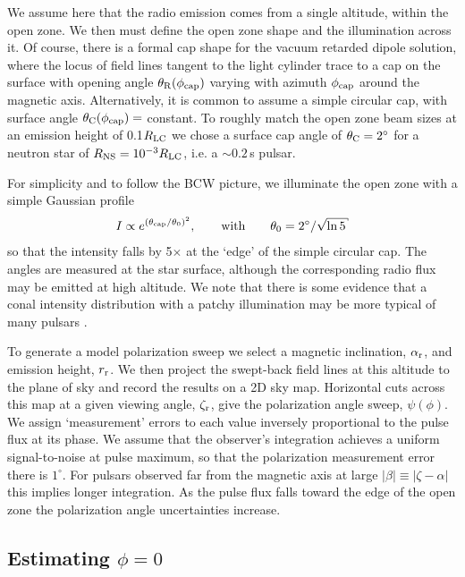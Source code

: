 	We assume here that the radio emission comes from a single altitude, 
within the open zone. We then must define the open zone shape and the illumination
across it. Of course, there is a formal cap shape for the vacuum retarded 
dipole solution, where the locus of field lines tangent to
the light cylinder trace to a cap on the surface with opening angle
$\theta_{\rm{R}} (\phi_{\rm{cap}})$ varying with azimuth $\phi_{\rm{cap}}$ around the magnetic axis.
Alternatively, it is common to assume a simple circular cap, with
surface angle $\theta_{\rm{C}} (\phi_{\rm{cap}})=$ constant. To roughly match the open zone
beam sizes at an emission height of 0.1$R_{\rm{LC}}$ we chose a surface cap angle of $\theta_{\rm{C}}=2^\circ$
for a neutron star of $R_{\rm{NS}} = 10^{-3}R_{\rm{LC}}$, i.e. a $\sim 0.2$\,s pulsar.

	For simplicity and to follow the BCW picture, we illuminate the open 
zone with a simple Gaussian profile 
\begin{equation}\label{eq:Ipulse}
I \propto e^{(\theta_{\rm{cap}}/\theta_0)^2},\qquad {\rm with }\qquad \theta_0=2^\circ/{\sqrt{\ln 5}}
\end{equation}
so that the intensity falls by 5$\times$ at the `edge' of the simple circular cap.
The angles are measured at the star surface, although the corresponding radio flux
may be emitted at high altitude.
We note that there is some evidence that a conal intensity distribution
with a patchy illumination may be more typical of many pulsars \citep{lyne1988shape,karastergiou2007empirical}. 

	To generate a model polarization sweep we select a magnetic inclination, $\alpha_{\rm{r}}$,
and emission height, $r_{\rm{r}}$. We then project the swept-back field lines 
at this altitude to the plane of sky and record the results on a 2D sky map.
Horizontal cuts across this map at a given viewing angle, $\zeta_{\rm{r}}$, give the
polarization angle sweep, $\psi(\phi)$. We assign `measurement' errors to each value inversely proportional
to the pulse flux at its phase. We assume that the observer's integration achieves
a uniform signal-to-noise at pulse maximum, so that the polarization measurement error
there is $1^\circ$. For pulsars observed far from the magnetic axis at large
$|\beta|\equiv |\zeta-\alpha|$ this implies longer integration.
As the pulse flux falls toward the edge of the open zone the polarization
angle uncertainties increase.

\subsection{Estimating $\phi=0$}

